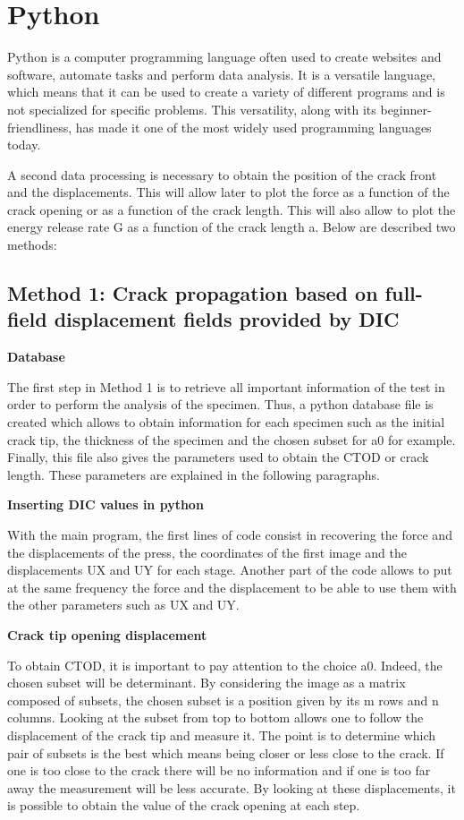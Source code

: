 \section{Python}

Python is a computer programming language often used to create websites and software, automate tasks and perform data analysis. It is a versatile language, which means that it can be used to create a variety of different programs and is not specialized for specific problems. This versatility, along with its beginner-friendliness, has made it one of the most widely used programming languages today.

A second data processing is necessary to obtain the position of the crack front and the displacements. This will allow later to plot the force as a function of the crack opening or as a function of the crack length. This will also allow to plot the energy release rate G as a function of the crack length a. Below are described two methods:

\subsection{Method 1: Crack propagation based on full-field displacement fields provided by DIC}

\textbf{Database}

The first step in Method 1 is to retrieve all important information of the test in order to perform the analysis of the specimen. Thus, a python database file is created which allows to obtain information for each specimen such as the initial crack tip, the thickness of the specimen and the chosen subset for a0 for example. Finally, this file also gives the parameters used to obtain the CTOD or crack length. These parameters are explained in the following paragraphs.

\textbf{Inserting DIC values in python}

With the main program, the first lines of code consist in recovering the force and the displacements of the press, the coordinates of the first image and the displacements UX and UY for each stage.
Another part of the code allows to put at the same frequency the force and the displacement to be able to use them with the other parameters such as UX and UY.

\textbf{Crack tip opening displacement}

To obtain CTOD, it is important to pay attention to the choice a0. Indeed, the chosen subset will be determinant. By considering the image as a matrix composed of subsets, the chosen subset is a position given by its m rows and n columns. Looking at the subset from top to bottom allows one to follow the displacement of the crack tip and measure it. The point is to determine which pair of subsets is the best which means being closer or less close to the crack. If one is too close to the crack there will be no information and if one is too far away the measurement will be less accurate. By looking at these displacements, it is possible to obtain the value of the crack opening at each step.

